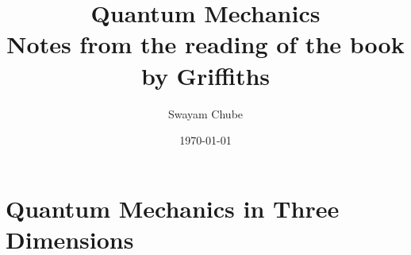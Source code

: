 \documentclass[12pt]{report}
\title{Quantum Mechanics\\\small Notes from the reading of the book by Griffiths}
\author{Swayam Chube}
\date{\today}
\begin{document}
    \maketitle
    \tableofcontents 

    \setcounter{chapter}{3}
    \chapter{Quantum Mechanics in Three Dimensions}
    
\end{document}
